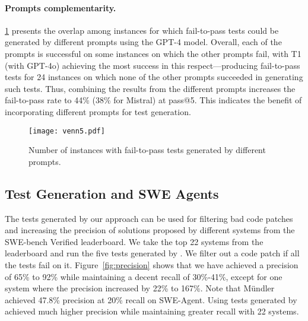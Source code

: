 \paragraph{Prompts complementarity.}

\cref{fig:venn} presents the overlap among instances for which fail-to-pass
tests could be generated by different prompts using the GPT-4 model. Overall,
each of the prompts is successful on some instances on which the other prompts
fail, with T1 (\solx with GPT-4o) achieving the most success in this
respect---producing fail-to-pass tests for 24 instances on which none of the
other prompts succeeded in generating such tests. Thus, combining the results
from the different prompts increases the fail-to-pass rate to 44\% (38\% for
Mistral) at pass@5. This indicates the benefit of incorporating different
prompts for test generation.


\begin{figure}[t]
    \centering
    \texttt{[image: venn5.pdf]}
    \vspace{-10pt}
    \caption{Number of instances with fail-to-pass tests generated by different prompts.}
    \label{fig:venn}
\end{figure}





\subsection{Test Generation and SWE Agents}
\label{sec:rq6}


The tests generated by our approach can be used for filtering bad code patches and
increasing the precision of solutions proposed by different systems from the
SWE-bench Verified leaderboard. We take the top 22 systems from the leaderboard
and run the five tests generated by \soly. We filter out a code patch if all the
tests fail on it. Figure~\ref{fig:precision} shows that we have achieved a
precision of 65\% to 92\% while maintaining a decent recall of 30\%-41\%, except
for one system where the precision increased by 22\% to 167\%. Note that
M{\"u}ndler \etal~\cite{mundler2024swtbench} achieved 47.8\% precision at 20\%
recall on SWE-Agent.
Using tests generated by \soly achieved much higher precision while maintaining
greater recall with 22 systems.

